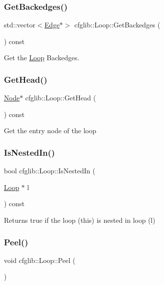 \subsubsection{\texorpdfstring{Get\+Backedges()}{GetBackedges()}}
{\footnotesize\ttfamily std\+::vector$<$\hyperlink{classcfglib_1_1Edge}{Edge}$\ast$$>$ cfglib\+::\+Loop\+::\+Get\+Backedges (\begin{DoxyParamCaption}{ }\end{DoxyParamCaption}) const}

Get the \hyperlink{classcfglib_1_1Loop}{Loop} Backedges. \mbox{\label{classcfglib_1_1Loop_ae6a56b136cd76001c559b80172da3e64}} 
\subsubsection{\texorpdfstring{Get\+Head()}{GetHead()}}
{\footnotesize\ttfamily \hyperlink{classcfglib_1_1Node}{Node}$\ast$ cfglib\+::\+Loop\+::\+Get\+Head (\begin{DoxyParamCaption}{ }\end{DoxyParamCaption}) const}

Get the entry node of the loop \mbox{\label{classcfglib_1_1Loop_a8deea5bb51a437e8417143e77ee435a7}} 
\subsubsection{\texorpdfstring{Is\+Nested\+In()}{IsNestedIn()}}
{\footnotesize\ttfamily bool cfglib\+::\+Loop\+::\+Is\+Nested\+In (\begin{DoxyParamCaption}\item[{\hyperlink{classcfglib_1_1Loop}{Loop} $\ast$}]{l }\end{DoxyParamCaption}) const}

Returns true if the loop (this) is nested in loop (l) \mbox{\label{classcfglib_1_1Loop_a8df5fb64b7864ba46b405dd16385fb90}} 
\subsubsection{\texorpdfstring{Peel()}{Peel()}}
{\footnotesize\ttfamily void cfglib\+::\+Loop\+::\+Peel (\begin{DoxyParamCaption}{ }\end{DoxyParamCaption})}

